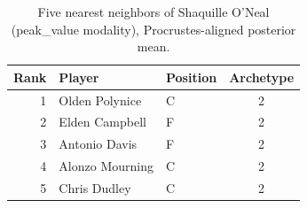 \begin{table}[htbp]
  \centering\small
  \begin{tabular}{rllc}
    \toprule
    Rank & Player & Position & Archetype \\
    \midrule
    1 & Olden Polynice & C & 2 \\
    2 & Elden Campbell & F & 2 \\
    3 & Antonio Davis & F & 2 \\
    4 & Alonzo Mourning & C & 2 \\
    5 & Chris Dudley & C & 2 \\
    \bottomrule
  \end{tabular}
  \caption{Five nearest neighbors of Shaquille O'Neal (peak_value modality), Procrustes-aligned posterior mean.}
  \label{tab:Shaquille_O_Neal_neighbors_peak_value}
\end{table}

